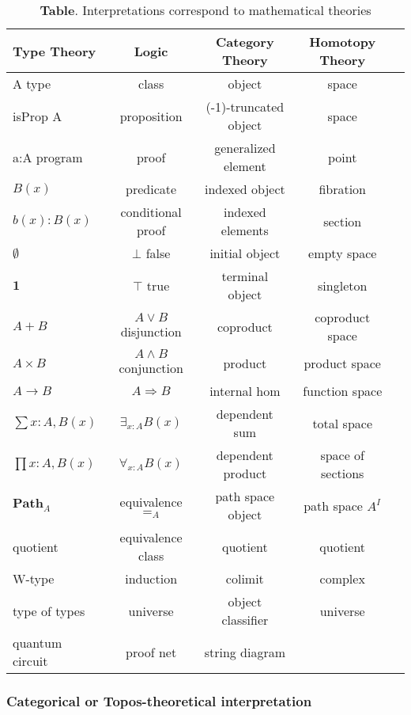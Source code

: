 \documentclass[twocolumn,10pt]{article}
\theoremstyle{definition}
\begin{document}
\begin{table}[!ht]
  \centering
  \caption*{\textbf{Table}. Interpretations correspond to mathematical theories}
  \begin{adjustbox}{width=\columnwidth,center}
  \begin{tabular}{lcccc}
    \hline
       Type Theory & Logic & Category Theory & Homotopy Theory\\
    \hline
       A type & class & object & space \\
       isProp A & proposition & (-1)-truncated object & space \\
       a:A program & proof & generalized element & point \\
       $B(x)$ & predicate & indexed object & fibration \\
       $b(x) : B(x)$ & conditional proof & indexed elements & section\\
       $\emptyset$ & $\bot$ false & initial object & empty space \\
       $\mathbf{1}$ & $\top$ true & terminal object & singleton \\
       $A + B$ & $A\vee B$ disjunction & coproduct & coproduct space \\
       $A\times B$ & $A\wedge B$ conjunction & product & product space \\
       $A\to B$ & $A\Rightarrow B$ & internal hom & function space \\
       $\sum{x:A},B(x)$ & $\exists_{x:A}B(x)$ & dependent sum & total space \\
       $\prod{x:A},B(x)$ & $\forall_{x:A}B(x)$ & dependent product & space of sections\\
       $\mathbf{Path}_{A}$ & equivalence $=_A$ & path space object & path space $A^I$ \\
       quotient & equivalence class & quotient & quotient \\
       W-type & induction & colimit & complex\\
       type of types & universe & object classifier & universe \\
       quantum circuit & proof net & string diagram & \\
      \hline
  \end{tabular}
  \end{adjustbox}
\end{table}

\subsubsection{Categorical or Topos-theoretical interpretation}
\end{document}
